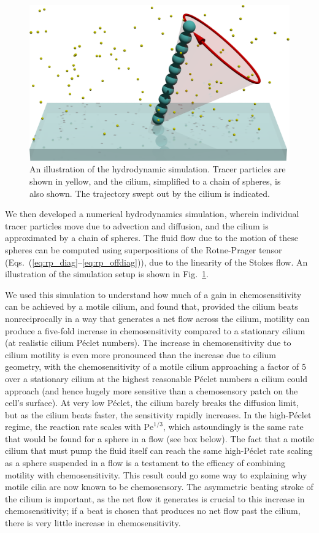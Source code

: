 \begin{figure}
    \centering
    \includegraphics{images_other/absorbing-cilium.png}
    \caption{An illustration of the hydrodynamic simulation. Tracer particles are shown in yellow, and the cilium, simplified to a chain of spheres, is also shown. The trajectory swept out by the cilium is indicated.}
    \label{fig:particle_simulation}
\end{figure}

We then developed a numerical hydrodynamics simulation, wherein individual tracer particles move due to advection and diffusion, and the cilium is approximated by a chain of spheres. The fluid flow due to the motion of these spheres can be computed using superpositions of the Rotne-Prager tensor (Eqs.~(\ref{eq:rp_diag}--\ref{eq:rp_offdiag})), due to the linearity of the Stokes flow. An illustration of the simulation setup is shown in Fig.~\ref{fig:particle_simulation}. 

We used this simulation to understand how much of a gain in chemosensitivity can be achieved by a motile cilium, and found that, provided the cilium beats nonreciprocally in a way that generates a net flow across the cilium, motility can produce a five-fold increase in chemosensitivity compared to a stationary cilium (at realistic cilium Péclet numbers). The increase in chemosensitivity due to cilium motility is even more pronounced than the increase due to cilium geometry, with the chemosensitivity of a motile cilium approaching a factor of $5$ over a stationary cilium at the highest reasonable Péclet numbers a cilium could approach (and hence hugely more sensitive than a chemosensory patch on the cell's surface). At very low Péclet, the cilium barely breaks the diffusion limit, but as the cilium beats faster, the sensitivity rapidly increases. In the high-Péclet regime, the reaction rate scales with $\mathrm{Pe}^{1/3}$, which astoundingly is the same rate that would be found for a sphere in a flow (see box below). The fact that a motile cilium that must pump the fluid itself can reach the same high-Péclet rate scaling as a sphere suspended in a flow is a testament to the efficacy of combining motility with chemosensitivity. This result could go some way to explaining why motile cilia are now known to be chemosensory. The asymmetric beating stroke of the cilium is important, as the net flow it generates is crucial to this increase in chemosensitivity; if a beat is chosen that produces no net flow past the cilium, there is very little increase in chemosensitivity.

